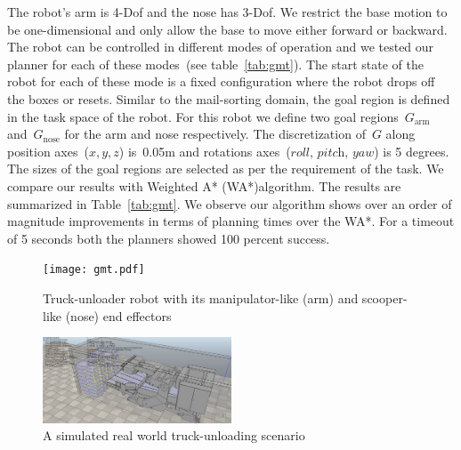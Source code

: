 \documentclass[a4paper,10pt]{article}
\begin{document}
The robot's arm is 4-Dof and the nose has 3-Dof. We restrict the base motion to be one-dimensional and only allow the base to move either forward or backward. The robot can be controlled in different modes of operation and we tested our planner for each of these modes~(see table~\ref{tab:gmt}). The start state of the robot for each of these mode is a fixed configuration where the robot drops off the boxes or resets. Similar to the mail-sorting domain, the goal region is defined in the task space of the robot. For this robot we define two goal regions~$G_{\textrm{arm}}$ and~$G_{\textrm{nose}}$ for the arm and nose respectively. The discretization of~$G$ along position axes~($x,y,z$) is~0.05m and rotations axes~($\textit{roll, pitch, yaw}$) is 5 degrees. The sizes of the goal regions are selected as per the requirement of the task.
We compare our results with Weighted A* (WA*)algorithm. The results are summarized in Table~\ref{tab:gmt}. We observe our algorithm shows over an order of magnitude improvements in terms of planning times over the WA*. For a timeout of 5 seconds both the planners showed 100 percent success.

\begin{figure}
\centering
\texttt{[image: gmt.pdf]}
  \caption{
  Truck-unloader robot with its manipulator-like (arm) and scooper-like (nose) end effectors
}
    \label{fig:gmt}
\end{figure}

\begin{figure}
\centering
\includegraphics[width=0.5\textwidth]{gmt_sim.png}
  \caption{
  A simulated real world truck-unloading scenario
}
    \label{fig:gmt_sim}
\end{figure}
\end{document}
